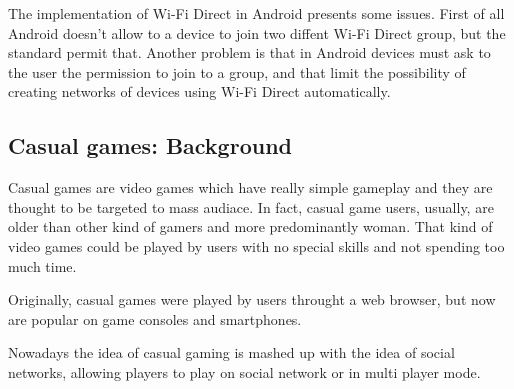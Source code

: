 The implementation of Wi-Fi Direct in Android presents some issues. First of all
Android doesn't allow to a device to join two diffent Wi-Fi Direct group, but 
the standard permit that. Another problem is that in Android devices must ask 
to the user the permission to join to a group, and that limit the possibility
of creating networks of devices using Wi-Fi Direct automatically.

\subsection{Casual games: Background}
Casual games are video games which have really simple gameplay and they are
thought to be targeted to mass audiace. In fact, casual game users, usually, are
older than other kind of gamers and more predominantly woman. That kind of video
games could be played by users with no special skills and not spending too much 
time.

Originally, casual games were played by users throught a web browser, but now 
are popular on game consoles and smartphones.

Nowadays the idea of casual gaming is mashed up with the idea of social networks,
allowing players to play on social network or in multi player mode.